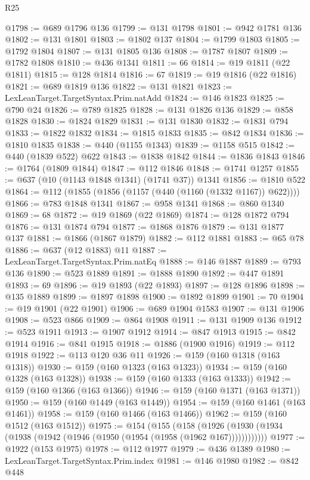 \begin{lexlean}{R25}
\begin{coremodule}
@1798 := @689 @1796 @136
@1799 := @131 @1798
@1801 := @942 @1781 @136
@1802 := @131 @1801
@1803 := @1802 @137
@1804 := @1799 @1803
@1805 := @1792 @1804
@1807 := @131 @1805 @136
@1808 := @1787 @1807
@1809 := @1782 @1808
@1810 := @436 @1341
@1811 := 66
@1814 := @19 @1811 (@22 @1811)
@1815 := @128 @1814
@1816 := 67
@1819 := @19 @1816 (@22 @1816)
@1821 := @689 @1819 @136
@1822 := @131 @1821
@1823 := LexLeanTarget.TargetSyntax.Prim.natAdd
@1824 := @146 @1823
@1825 := @790 @24
@1826 := @789 @1825
@1828 := @131 @1826 @136
@1829 := @858 @1828
@1830 := @1824 @1829
@1831 := @131 @1830
@1832 := @1831 @794
@1833 := @1822 @1832
@1834 := @1815 @1833
@1835 := @842 @1834
@1836 := @1810 @1835
@1838 := @440 (@1155 @1343)
@1839 := @1158 @515
@1842 := @440 (@1839 @522) @622
@1843 := @1838 @1842
@1844 := @1836 @1843
@1846 := @1764 (@1809 @1844)
@1847 := @112 @1846
@1848 := @1741 @1257
@1855 := @637 (@10 (@1143 @1848 @1341) (@1741 @37)) @1341
@1856 := @1810 @522
@1864 := @112 (@1855 (@1856 (@1157 (@440 (@1160 (@1332 @1167)) @622))))
@1866 := @783 @1848 @1341
@1867 := @958 @1341
@1868 := @860 @1340
@1869 := 68
@1872 := @19 @1869 (@22 @1869)
@1874 := @128 @1872 @794
@1876 := @131 @1874 @794
@1877 := @1868 @1876
@1879 := @131 @1877 @137
@1881 := @1866 (@1867 @1879)
@1882 := @112 @1881
@1883 := @65 @78
@1886 := @637 (@12 @1883) @11
@1887 := LexLeanTarget.TargetSyntax.Prim.natEq
@1888 := @146 @1887
@1889 := @793 @136
@1890 := @523 @1889
@1891 := @1888 @1890
@1892 := @447 @1891
@1893 := 69
@1896 := @19 @1893 (@22 @1893)
@1897 := @128 @1896
@1898 := @135 @1889
@1899 := @1897 @1898
@1900 := @1892 @1899
@1901 := 70
@1904 := @19 @1901 (@22 @1901)
@1906 := @689 @1904 @1583
@1907 := @131 @1906
@1908 := @523 @866
@1909 := @864 @1908
@1911 := @131 @1909 @136
@1912 := @523 @1911
@1913 := @1907 @1912
@1914 := @847 @1913
@1915 := @842 @1914
@1916 := @841 @1915
@1918 := @1886 (@1900 @1916)
@1919 := @112 @1918
@1922 := @113 @120 @36 @11
@1926 := @159 (@160 @1318 (@163 @1318))
@1930 := @159 (@160 @1323 (@163 @1323))
@1934 := @159 (@160 @1328 (@163 @1328))
@1938 := @159 (@160 @1333 (@163 @1333))
@1942 := @159 (@160 @1366 (@163 @1366))
@1946 := @159 (@160 @1371 (@163 @1371))
@1950 := @159 (@160 @1449 (@163 @1449))
@1954 := @159 (@160 @1461 (@163 @1461))
@1958 := @159 (@160 @1466 (@163 @1466))
@1962 := @159 (@160 @1512 (@163 @1512))
@1975 := @154
    (@155
      (@158 (@1926 (@1930 (@1934 (@1938 (@1942 (@1946 (@1950 (@1954 (@1958 (@1962 @167))))))))))))
@1977 := @1922 (@153 @1975)
@1978 := @112 @1977
@1979 := @436 @1389
@1980 := LexLeanTarget.TargetSyntax.Prim.index
@1981 := @146 @1980
@1982 := @842 @448

\end{coremodule}
\end{lexlean}
